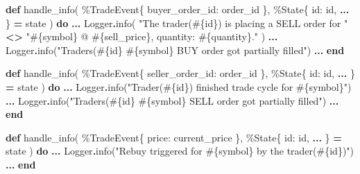\documentclass[
]{book}
\newenvironment{Shaded}{\begin{snugshade}}{\end{snugshade}}
\newcommand{\ConstantTok}[1]{\textcolor[rgb]{0.00,0.00,0.00}{#1}}
\newcommand{\KeywordTok}[1]{\textcolor[rgb]{0.13,0.29,0.53}{\textbf{#1}}}
\newcommand{\NormalTok}[1]{#1}
\newcommand{\OperatorTok}[1]{\textcolor[rgb]{0.81,0.36,0.00}{\textbf{#1}}}
\newcommand{\OtherTok}[1]{\textcolor[rgb]{0.56,0.35,0.01}{#1}}
\newcommand{\StringTok}[1]{\textcolor[rgb]{0.31,0.60,0.02}{#1}}
\newcommand{\VariableTok}[1]{\textcolor[rgb]{0.00,0.00,0.00}{#1}}
\begin{document}
\begin{Shaded}
\begin{Highlighting}[]
  \KeywordTok{def}\NormalTok{ handle\_info(}
\NormalTok{        \%}\ConstantTok{TradeEvent}\NormalTok{\{}
          \VariableTok{buyer\_order\_id:}\NormalTok{ order\_id}
\NormalTok{        \},}
\NormalTok{        \%}\ConstantTok{State}\NormalTok{\{}
          \VariableTok{id:}\NormalTok{ id,}
          \OperatorTok{...}
\NormalTok{        \} }\OperatorTok{=}\NormalTok{ state}
\NormalTok{      ) }\KeywordTok{do}
    \OperatorTok{...}
        \ConstantTok{Logger}\OperatorTok{.}\NormalTok{info(}
          \StringTok{"The trader(}\OtherTok{\#\{}\NormalTok{id}\OtherTok{\}}\StringTok{) is placing a SELL order for "} \OperatorTok{\textless{}\textgreater{}}
            \StringTok{"}\OtherTok{\#\{}\NormalTok{symbol}\OtherTok{\}}\StringTok{ @ }\OtherTok{\#\{}\NormalTok{sell\_price}\OtherTok{\}}\StringTok{, quantity: }\OtherTok{\#\{}\NormalTok{quantity}\OtherTok{\}}\StringTok{."}
\NormalTok{        )}
        \OperatorTok{...}
        \ConstantTok{Logger}\OperatorTok{.}\NormalTok{info(}\StringTok{"Trader\textquotesingle{}s(}\OtherTok{\#\{}\NormalTok{id}\OtherTok{\}}\StringTok{ }\OtherTok{\#\{}\NormalTok{symbol}\OtherTok{\}}\StringTok{ BUY order got partially filled"}\NormalTok{)}
        \OperatorTok{...}
  \KeywordTok{end}

  \KeywordTok{def}\NormalTok{ handle\_info(}
\NormalTok{        \%}\ConstantTok{TradeEvent}\NormalTok{\{}
          \VariableTok{seller\_order\_id:}\NormalTok{ order\_id}
\NormalTok{        \},}
\NormalTok{        \%}\ConstantTok{State}\NormalTok{\{}
          \VariableTok{id:}\NormalTok{ id,}
          \OperatorTok{...}
\NormalTok{        \} }\OperatorTok{=}\NormalTok{ state}
\NormalTok{      ) }\KeywordTok{do}
    \OperatorTok{...}
      \ConstantTok{Logger}\OperatorTok{.}\NormalTok{info(}\StringTok{"Trader(}\OtherTok{\#\{}\NormalTok{id}\OtherTok{\}}\StringTok{) finished trade cycle for }\OtherTok{\#\{}\NormalTok{symbol}\OtherTok{\}}\StringTok{"}\NormalTok{)}
      \OperatorTok{...}
      \ConstantTok{Logger}\OperatorTok{.}\NormalTok{info(}\StringTok{"Trader\textquotesingle{}s(}\OtherTok{\#\{}\NormalTok{id}\OtherTok{\}}\StringTok{ }\OtherTok{\#\{}\NormalTok{symbol}\OtherTok{\}}\StringTok{ SELL order got partially filled"}\NormalTok{)      }\OperatorTok{...}
  \KeywordTok{end}

  \KeywordTok{def}\NormalTok{ handle\_info(}
\NormalTok{        \%}\ConstantTok{TradeEvent}\NormalTok{\{}
          \VariableTok{price:}\NormalTok{ current\_price}
\NormalTok{        \},}
\NormalTok{        \%}\ConstantTok{State}\NormalTok{\{}
          \VariableTok{id:}\NormalTok{ id,}
          \OperatorTok{...}
\NormalTok{        \} }\OperatorTok{=}\NormalTok{ state}
\NormalTok{      ) }\KeywordTok{do}
      \OperatorTok{...}
      \ConstantTok{Logger}\OperatorTok{.}\NormalTok{info(}\StringTok{"Rebuy triggered for }\OtherTok{\#\{}\NormalTok{symbol}\OtherTok{\}}\StringTok{ by the trader(}\OtherTok{\#\{}\NormalTok{id}\OtherTok{\}}\StringTok{)"}\NormalTok{)}
      \OperatorTok{...}
  \KeywordTok{end}
\end{Highlighting}
\end{Shaded}
\end{document}

